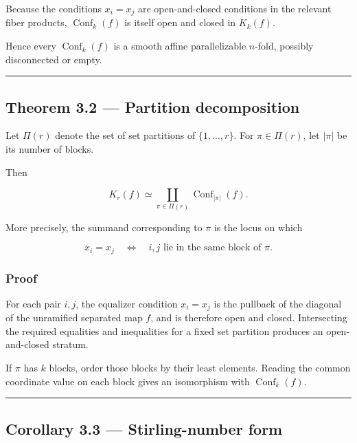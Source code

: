 Because the conditions \(x_i=x_j\) are open-and-closed conditions in the
relevant fiber products, \(\operatorname{Conf}_k(f)\) is itself open and
closed in \(K_k(f)\).

Hence every \(\operatorname{Conf}_k(f)\) is a smooth affine
parallelizable \(n\)-fold, possibly disconnected or empty.

\begin{center}\rule{0.5\linewidth}{0.5pt}\end{center}

\subsection{Theorem 3.2 --- Partition
decomposition}\label{theorem-3.2-partition-decomposition}

Let \(\Pi(r)\) denote the set of set partitions of \(\{1,\dots,r\}\).
For \(\pi\in\Pi(r)\), let \(|\pi|\) be its number of blocks.

Then

\[
\boxed{
K_r(f)\simeq
\coprod_{\pi\in\Pi(r)} \operatorname{Conf}_{|\pi|}(f).
}
\]

More precisely, the summand corresponding to \(\pi\) is the locus on
which

\[
x_i=x_j
\quad\Longleftrightarrow\quad
i,j\text{ lie in the same block of }\pi.
\]

\subsubsection{Proof}\label{proof-3}

For each pair \(i,j\), the equalizer condition \(x_i=x_j\) is the
pullback of the diagonal of the unramified separated map \(f\), and is
therefore open and closed. Intersecting the required equalities and
inequalities for a fixed set partition produces an open-and-closed
stratum.

If \(\pi\) has \(k\) blocks, order those blocks by their least elements.
Reading the common coordinate value on each block gives an isomorphism
with \(\operatorname{Conf}_k(f)\).

\begin{center}\rule{0.5\linewidth}{0.5pt}\end{center}

\subsection{Corollary 3.3 --- Stirling-number
form}\label{corollary-3.3-stirling-number-form}

